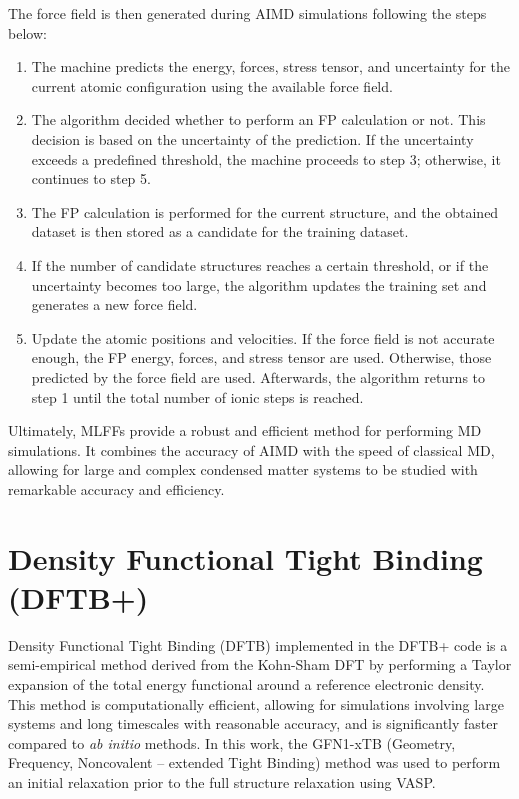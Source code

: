 The force field is then generated during AIMD simulations following the steps below:
\begin{enumerate}
    \item The machine predicts the energy, forces, stress tensor, and uncertainty for the current atomic configuration using the available force field. 

    \item The algorithm decided whether to perform an FP calculation or not. This decision is based on the uncertainty of the prediction. If the uncertainty exceeds a predefined threshold, the machine proceeds to step 3; otherwise, it continues to step 5. 

    \item The FP calculation is performed for the current structure, and the obtained dataset is then stored as a candidate for the training dataset. 

    \item If the number of candidate structures reaches a certain threshold, or if the uncertainty becomes too large, the algorithm updates the training set and generates a new force field. 

    \item Update the atomic positions and velocities. If the force field is not accurate enough, the FP energy, forces, and stress tensor are used. Otherwise, those predicted by the force field are used. Afterwards, the algorithm returns to step 1 until the total number of ionic steps is reached.
\end{enumerate}

Ultimately, MLFFs provide a robust and efficient method for performing MD simulations. It combines the accuracy of AIMD with the speed of classical MD, allowing for large and complex condensed matter systems to be studied with remarkable accuracy and efficiency.

\section{Density Functional Tight Binding (DFTB+)}
Density Functional Tight Binding (DFTB) implemented in the DFTB+ code\supercite{Hourahine2020} is a semi-empirical method derived from the Kohn-Sham DFT by performing a Taylor expansion of the total energy functional around a reference electronic density. This method is computationally efficient, allowing for simulations involving large systems and long timescales with reasonable accuracy, and is significantly faster compared to \emph{ab initio} methods. In this work, the GFN1-xTB (Geometry, Frequency, Noncovalent – extended Tight Binding) method was used to perform an initial relaxation prior to the full structure relaxation using VASP.
